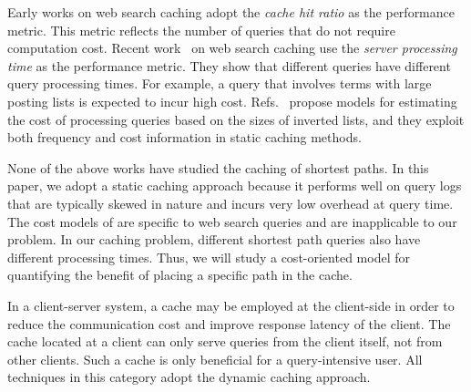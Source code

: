 \documentclass{sig-alternate}
\newcommand{\stitle}[1]{\vspace*{0.4em}\noindent{\bf #1:\/}}
\begin{document}
%


Early works on web search caching adopt the {\em cache hit ratio} as the performance metric.
This metric reflects the number of queries that do not require computation cost.
%
Recent work~\cite{BaezaYates07,AltingovdeOU09,Ozcan2011} on web search caching use the {\em server processing time} as the performance metric.
They show that different queries have different query processing times.
For example, a query that involves terms with large posting lists is expected to incur high cost.
Refs.~\cite{AltingovdeOU09,Ozcan2011} propose models for estimating the cost of processing queries
based on the sizes of inverted lists, and they exploit both frequency and cost information in static caching methods.










None of the above works have studied the caching of shortest paths.
In this paper, we adopt a static caching approach
because it performs well on query logs that are typically skewed in nature and incurs very low overhead at query time.
The cost models of \cite{AltingovdeOU09,Ozcan2011} are specific to web search queries
and are inapplicable to our problem.
In our caching problem, different shortest path queries also have different processing times.
Thus, we will study a cost-oriented model for quantifying the benefit of placing a specific path in the cache.



\stitle{Semantic Caching}
%
In a client-server system, a cache may be employed at the client-side in order to reduce the communication cost
and improve response latency of the client.
The cache located at a client can only serve queries from the client itself, not from other clients.
Such a cache is only beneficial for a query-intensive user. %
All techniques in this category adopt the dynamic caching approach.
\end{document}
